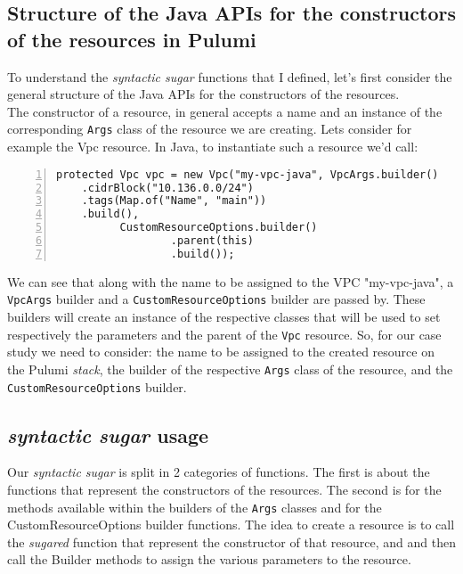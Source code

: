\subsection{Structure of the Java APIs for the constructors of the resources in Pulumi}
To understand the \textit{syntactic sugar} functions that I defined, let's first consider the general structure of the Java APIs for the constructors of the resources.\\
The constructor of a resource, in general accepts a name and an instance of the corresponding \texttt{Args} class of the resource we are creating.
Lets consider for example the Vpc resource.
In Java, to instantiate such a resource we'd call:\\
\begin{minipage}{\linewidth}
\begin{lstlisting}[numbers=left, numberstyle=\tiny, numbersep=-5pt, stepnumber=1]
  protected Vpc vpc = new Vpc("my-vpc-java", VpcArgs.builder()
    .cidrBlock("10.136.0.0/24")
    .tags(Map.of("Name", "main"))
    .build(),
          CustomResourceOptions.builder()
                  .parent(this)
                  .build());
\end{lstlisting}
\end{minipage}
We can see that along with the name to be assigned to the VPC "my-vpc-java", a \texttt{VpcArgs} builder and a \texttt{CustomResourceOptions} builder are passed by.
These builders will create an instance of the respective classes that will be used to set respectively the parameters and the parent of the \texttt{Vpc} resource.
So, for our case study we need to consider: the name to be assigned to the created resource on the Pulumi \textit{stack}, the builder of the respective \texttt{Args} class of the resource, and the \texttt{CustomResourceOptions} builder.


\subsection{\textit{syntactic sugar} usage}
\label{ssec:syn-sug-usage}
Our \textit{syntactic sugar} is split in 2 categories of functions.
The first is about the functions that represent the constructors of the resources.
The second is for the methods available within the builders of the \texttt{Args} classes and for the CustomResourceOptions builder functions.
The idea to create a resource is to call the \textit{sugared} function that represent the constructor of that resource, and and then call the Builder methods to assign the various parameters to the resource.

